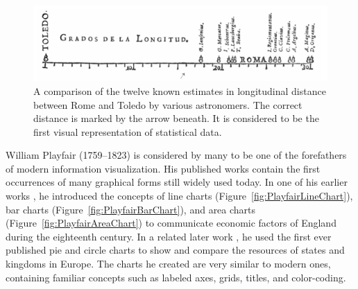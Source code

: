 


\begin{figure}[tp]
\centering
\includegraphics[keepaspectratio,width=\linewidth,height=\thirdh]
{images/rome-toledo-longitude.png}
\caption[Chart of Longitudinal Distance Determinations Between Toledo and Rome From 1644]{%
A comparison of the twelve known estimates in longitudinal
distance between Rome and Toledo by various astronomers. The correct
distance is marked by the arrow beneath. It is considered to be the
first visual representation of statistical data.
}
\label{fig:RomeToledoLongitude}
\end{figure}







William Playfair (1759--1823) is considered by many to be one of the
forefathers of modern information visualization. His published works
contain the first occurrences of many graphical forms still widely
used today. In one of his earlier works
\parencite{CommercialAndPoliticalAtlas}, he introduced the concepts of
line charts (Figure~\ref{fig:PlayfairLineChart}), bar charts
(Figure~\ref{fig:PlayfairBarChart}), and area charts
(Figure~\ref{fig:PlayfairAreaChart}) to communicate economic factors
of England during the eighteenth century. In a related later work
\parencite{StatisticalBreviary}, he used the first ever published pie
and circle charts to show and compare the resources of states and
kingdoms in Europe. The charts he created are very similar to modern
ones, containing familiar concepts such as labeled axes, grids,
titles, and color-coding.



